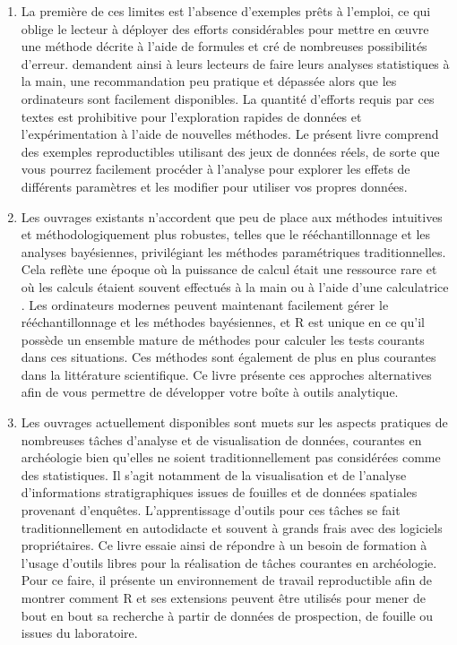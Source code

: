 \documentclass[
  french,
]{scrbook}
\begin{document}
\begin{enumerate}
\def\labelenumi{\arabic{enumi}.}
\item
  La première de ces limites est l'absence d'exemples prêts à l'emploi, ce qui oblige le lecteur à déployer des efforts considérables pour mettre en œuvre une méthode décrite à l'aide de formules et cré de nombreuses possibilités d'erreur. \textcite{vanpool2010} demandent ainsi à leurs lecteurs de faire leurs analyses statistiques à la main, une recommandation peu pratique et dépassée alors que les ordinateurs sont facilement disponibles. La quantité d'efforts requis par ces textes est prohibitive pour l'exploration rapides de données et l'expérimentation à l'aide de nouvelles méthodes. Le présent livre comprend des exemples reproductibles utilisant des jeux de données réels, de sorte que vous pourrez facilement procéder à l'analyse pour explorer les effets de différents paramètres et les modifier pour utiliser vos propres données.
\item
  Les ouvrages existants n'accordent que peu de place aux méthodes intuitives et méthodologiquement plus robustes, telles que le rééchantillonnage et les analyses bayésiennes, privilégiant les méthodes paramétriques traditionnelles. Cela reflète une époque où la puissance de calcul était une ressource rare et où les calculs étaient souvent effectués à la main ou à l'aide d'une calculatrice \autocite[voir par exemple][]{fletcher1991}. Les ordinateurs modernes peuvent maintenant facilement gérer le rééchantillonnage et les méthodes bayésiennes, et R est unique en ce qu'il possède un ensemble mature de méthodes pour calculer les tests courants dans ces situations. Ces méthodes sont également de plus en plus courantes dans la littérature scientifique. Ce livre présente ces approches alternatives afin de vous permettre de développer votre boîte à outils analytique.
\item
  Les ouvrages actuellement disponibles sont muets sur les aspects pratiques de nombreuses tâches d'analyse et de visualisation de données, courantes en archéologie bien qu'elles ne soient traditionnellement pas considérées comme des statistiques. Il s'agit notamment de la visualisation et de l'analyse d'informations stratigraphiques issues de fouilles et de données spatiales provenant d'enquêtes. L'apprentissage d'outils pour ces tâches se fait traditionnellement en autodidacte et souvent à grands frais avec des logiciels propriétaires. Ce livre essaie ainsi de répondre à un besoin de formation à l'usage d'outils libres pour la réalisation de tâches courantes en archéologie. Pour ce faire, il présente un environnement de travail reproductible afin de montrer comment R et ses extensions peuvent être utilisés pour mener de bout en bout sa recherche à partir de données de prospection, de fouille ou issues du laboratoire.
\end{enumerate}
\end{document}
